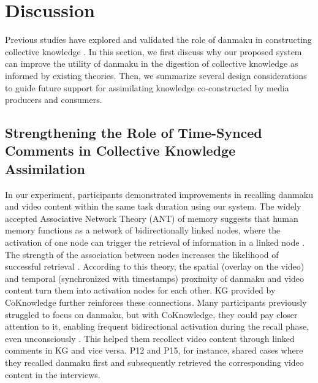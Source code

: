 \section{Discussion}

Previous studies have explored and validated the role of danmaku in constructing collective knowledge \cite{he2021beyond, wu2018danmaku, wu2019danmaku}. 
In this section, we first discuss why our proposed system can improve the utility of danmaku in the digestion of collective knowledge as informed by existing theories. Then, we summarize several design considerations to guide future support for assimilating knowledge co-constructed by media producers and consumers.

\subsection{Strengthening the Role of Time-Synced Comments in Collective Knowledge Assimilation}


In our experiment, participants demonstrated improvements in recalling danmaku and video content within the same task duration using our system.
The widely accepted Associative Network Theory (ANT) of memory suggests that human memory functions as a network of bidirectionally linked nodes, where the activation of one node can trigger the retrieval of information in a linked node \cite{collins1975spreading, wheeler2017using, teichert2010exploring, lee2016memory}. The strength of the association between nodes increases the likelihood of successful retrieval \cite{teichert2010exploring}. 
According to this theory, the spatial (overlay on the video) and temporal (synchronized with timestamps) proximity of danmaku and video content turn them into activation nodes for each other. KG provided by CoKnowledge further reinforces these connections. Many participants previously struggled to focus on danmaku, but with CoKnowledge, they could pay closer attention to it, enabling frequent bidirectional activation during the recall phase, even unconsciously \cite{teichert2010exploring}. This helped them recollect video content through linked comments in KG and vice versa. 
P12 and P15, for instance, shared cases where they recalled danmaku first and subsequently retrieved the corresponding video content in the interviews. 

